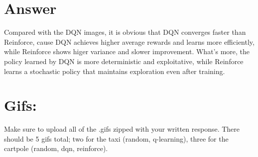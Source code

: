 \documentclass{article}
\begin{document}
\section*{Answer}
Compared with the DQN images, it is obvious that DQN converges faster than Reinforce, cause DQN achieves higher average rewards and learns more efficiently, while Reinforce shows higer variance and slower improvement. What's more, the policy learned by DQN is more deterministic and exploitative, while Reinforce learns a stochastic policy that maintains exploration even after training. 

\section*{Gifs:}
Make sure to upload all of the .gifs zipped with your written response. There should be 5 gifs total; two for the taxi (random, q-learning), three for the cartpole (random, dqn, reinforce).
\end{document}
